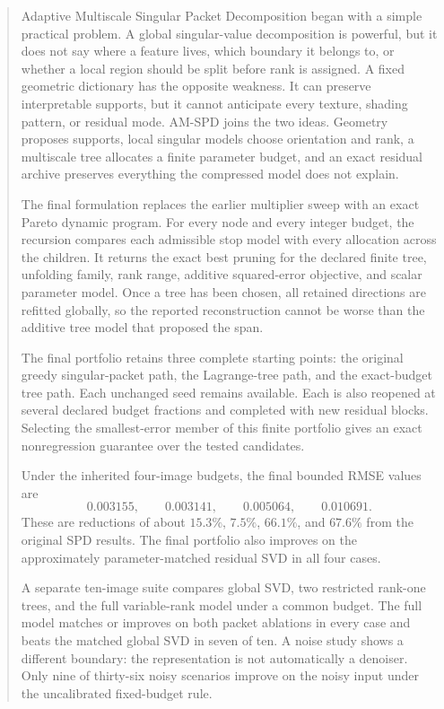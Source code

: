 \documentclass[11pt]{article}
\theoremstyle{definition}
\theoremstyle{remark}
\begin{document}
\begin{abstract}
Adaptive Multiscale Singular Packet Decomposition began with a simple practical problem. A global singular-value decomposition is powerful, but it does not say where a feature lives, which boundary it belongs to, or whether a local region should be split before rank is assigned. A fixed geometric dictionary has the opposite weakness. It can preserve interpretable supports, but it cannot anticipate every texture, shading pattern, or residual mode. AM-SPD joins the two ideas. Geometry proposes supports, local singular models choose orientation and rank, a multiscale tree allocates a finite parameter budget, and an exact residual archive preserves everything the compressed model does not explain.

The final formulation replaces the earlier multiplier sweep with an exact Pareto dynamic program. For every node and every integer budget, the recursion compares each admissible stop model with every allocation across the children. It returns the exact best pruning for the declared finite tree, unfolding family, rank range, additive squared-error objective, and scalar parameter model. Once a tree has been chosen, all retained directions are refitted globally, so the reported reconstruction cannot be worse than the additive tree model that proposed the span.

The final portfolio retains three complete starting points: the original greedy singular-packet path, the Lagrange-tree path, and the exact-budget tree path. Each unchanged seed remains available. Each is also reopened at several declared budget fractions and completed with new residual blocks. Selecting the smallest-error member of this finite portfolio gives an exact nonregression guarantee over the tested candidates.

Under the inherited four-image budgets, the final bounded RMSE values are
\[
0.003155,\qquad 0.003141,\qquad 0.005064,\qquad 0.010691.
\]
These are reductions of about $15.3\%$, $7.5\%$, $66.1\%$, and $67.6\%$ from the original SPD results. The final portfolio also improves on the approximately parameter-matched residual SVD in all four cases.

A separate ten-image suite compares global SVD, two restricted rank-one trees, and the full variable-rank model under a common budget. The full model matches or improves on both packet ablations in every case and beats the matched global SVD in seven of ten. A noise study shows a different boundary: the representation is not automatically a denoiser. Only nine of thirty-six noisy scenarios improve on the noisy input under the uncalibrated fixed-budget rule.


\end{abstract}
\end{document}
